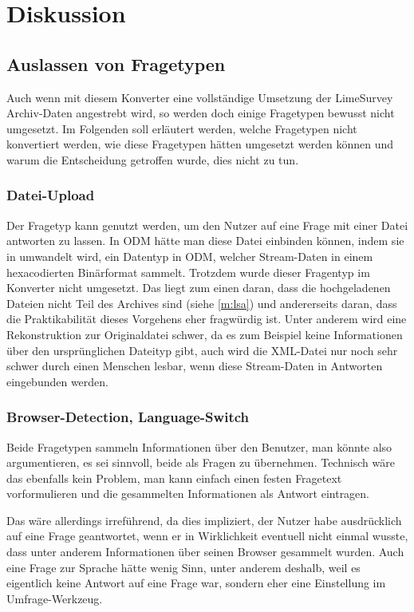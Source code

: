 \chapter{Diskussion}
\label{ch:diskussion}

\section{Auslassen von Fragetypen}
\label{d:leave}

Auch wenn mit diesem Konverter eine vollständige Umsetzung der LimeSurvey Archiv-Daten angestrebt wird, so werden doch einige Fragetypen bewusst nicht umgesetzt.
Im Folgenden soll erläutert werden, welche Fragetypen nicht konvertiert werden, wie diese Fragetypen hätten umgesetzt werden können und warum die Entscheidung getroffen wurde, dies nicht zu tun.

\subsection{Datei-Upload}
\label{d:upload}

Der Fragetyp  kann genutzt werden, um den Nutzer auf eine Frage mit einer Datei antworten zu lassen.
In ODM hätte man diese Datei einbinden können, indem sie in  umwandelt wird, ein Datentyp in ODM, welcher Stream-Daten in einem hexacodierten Binärformat sammelt.
Trotzdem wurde dieser Fragentyp im Konverter nicht umgesetzt.
Das liegt zum einen daran, dass die hochgeladenen Dateien nicht Teil des Archives sind (siehe \cref{m:lsa}) und andererseits daran, dass die Praktikabilität dieses Vorgehens eher fragwürdig ist.
Unter anderem wird eine Rekonstruktion zur Originaldatei schwer, da es zum Beispiel keine Informationen über den ursprünglichen Dateityp gibt, auch wird die XML-Datei nur noch sehr schwer durch einen Menschen lesbar, wenn diese Stream-Daten in Antworten eingebunden werden. 

\subsection{Browser-Detection, Language-Switch}

Beide Fragetypen sammeln Informationen über den Benutzer, man könnte also argumentieren, es sei sinnvoll, beide als Fragen zu übernehmen.
Technisch wäre das ebenfalls kein Problem, man kann einfach einen festen Fragetext vorformulieren und die gesammelten Informationen als Antwort eintragen.

Das wäre allerdings irreführend, da dies impliziert, der Nutzer habe ausdrücklich auf eine Frage geantwortet, wenn er in Wirklichkeit eventuell nicht einmal wusste, dass unter anderem Informationen über seinen Browser gesammelt wurden.
Auch eine Frage zur Sprache hätte wenig Sinn, unter anderem deshalb, weil es eigentlich keine Antwort auf eine Frage war, sondern eher eine Einstellung im Umfrage-Werkzeug.

